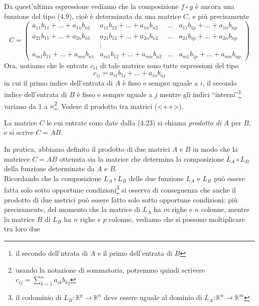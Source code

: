 Da quest'ultima espressione vediamo che la composizione $f\circ g$ è ancora una funzione del tipo
(4.9), cioè è determinata da una matrice $C$, e più precisamente
\begin{equation}
  \label{eq:4.22}
  C=
  \begin{pmatrix}
    a_{11}b_{11}+\dots+a_{1n}b_{n1}&a_{11}b_{12}+\dots+a_{1n}b_{n2}&\dots & a_{11}b_{1p}+\dots+a_{1n}b_{np}\\
    a_{21}b_{11}+\dots+a_{2n}b_{n1}&a_{21}b_{12}+\dots+a_{2n}b_{n2}&\dots & a_{21}b_{1p}+\dots+a_{2n}b_{np}\\
    &\vdots\\
    a_{m1}b_{11}+\dots+a_{mn}b_{n1}&a_{m1}b_{12}+\dots+a_{mn}b_{n2}&\dots & a_{m1}b_{1p}+\dots+a_{mn}b_{np}
  \end{pmatrix}
\end{equation}
Ora, notiamo che le entrate $c_{i1}$ di tale matrice sono tutte espressioni del tipo
\begin{equation}
  \label{eq:4.23}
  c_{ij}=a_{i1}b_{1j}+\dots+a_{in}b_{nj}
\end{equation}
in cui il primo indice dell'entrata di $A$ è fisso e sempre uguale a $i$, il secondo indice
dell'entrata di $B$ è fisso e sempre uguale a $j$ mentre gli indici ``interni''\footnote{il
  secondo dell'ntrata di $A$ e il primo dell'entrata di $B$} variano da 1 a $n$\footnote{usando
  la notazione di sommatoria, potremmo quindi scrivere $c_{ij}=\displaystyle\sum^n_{k=1}a_{ik}
  b_{kj}$}. Vedere il prodotto tra matrici (<++>).
\begin{definizione}
  La matrice $C$ le cui entrate sono date dalla (4.23) si chiama \textit{prodotto di} $A$ per
  $B$, e si scrive $C=AB$.
\end{definizione}
In pratica, abbiamo definito il prodotto di due matrici $A$ e $B$ in modo che la matriece $C=AB$
ottenuta sia la matrice che determina la composizione $L_A\circ L_B$ della funzione determinate
da $A$ e $B$.\\
Ricordando che la composizione $L_A\circ L_B$ delle due funzione $L_A$ e $L_B$ può essere fatta
solo sotto opportune condizioni\footnote{il codominio di $L_B:\mathbb{K}^p\to\mathbb{K}^n$ deve
  essere uguale al dominio di $L_A:\mathbb{K}^n\to\mathbb{K}^m$} si osserva di conseguenza che
anche il prodotto di due metrici può essere fatto solo sotto opportune condizioni: più
precisamente, del momento che la matrice di $L_A$ ha $m$ righe e $n$ colonne, mentre la matrice
$B$ di $L_B$ ha $n$ righe e $p$ colonne, vediamo che si possono moltiplicare tra loro due
